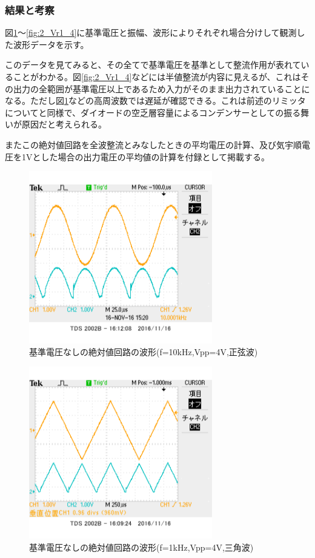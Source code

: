 \documentclass[11pt,a4j]{jsarticle}
\begin{document}
   \subsubsection{結果と考察} \label{sec:abs_wave}
    
    図\ref{fig:2_Vr0_sin}～\ref{fig:2_Vr1_4}に基準電圧と振幅、波形によりそれぞれ場合分けして観測した波形データを示す。
    
    このデータを見てみると、その全てで基準電圧を基準として整流作用が表れていることがわかる。図\ref{fig:2_Vr1_4}などには半値整流が内容に見えるが、これはその出力の全範囲が基準電圧以上であるため入力がそのまま出力されていることになる。ただし図\ref{fig:2_Vr0_sin}などの高周波数では遅延が確認できる。これは前述のリミッタについてと同様で、ダイオードの空乏層容量によるコンデンサーとしての振る舞いが原因だと考えられる。
    
    またこの絶対値回路を全波整流とみなしたときの平均電圧の計算、及び気宇順電圧を1Vとした場合の出力電圧の平均値の計算を付録として掲載する。
    
    \begin{figure}[htbp]
  \centering
  \includegraphics[width=8cm,clip]{2_abs_Vr0_f10V4sin_ViVo.png}
  \caption{基準電圧なしの絶対値回路の波形(f=10kHz,Vpp=4V,正弦波)}
  \label{fig:2_Vr0_sin}
 \end{figure}%
    
    
    \begin{figure}[htbp]
  \centering
  \includegraphics[width=8cm,clip]{2_abs_Vr0_f1V4sankaku_ViVo.png}
  \caption{基準電圧なしの絶対値回路の波形(f=1kHz,Vpp=4V,三角波)}
  \label{fig:2_Vr0_sankaku}
 \end{figure}%
  
\end{document}
